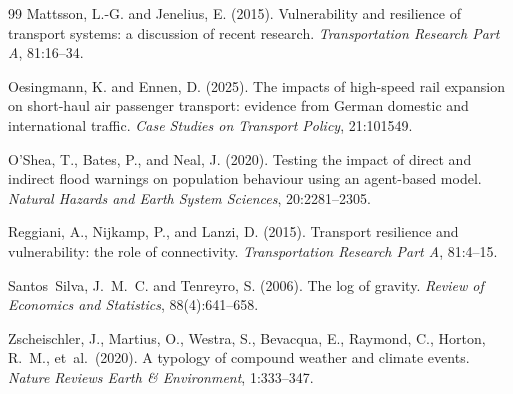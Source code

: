 \documentclass[12pt,a4paper]{article}
\begin{document}
\begin{thebibliography}{99}
Mattsson, L.-G. and Jenelius, E. (2015).
Vulnerability and resilience of transport systems: a discussion of recent research.
\textit{Transportation Research Part A}, 81:16--34.

Oesingmann, K. and Ennen, D. (2025).
The impacts of high-speed rail expansion on short-haul air passenger transport:
evidence from German domestic and international traffic.
\textit{Case Studies on Transport Policy}, 21:101549.

O'Shea, T., Bates, P., and Neal, J. (2020).
Testing the impact of direct and indirect flood warnings on population behaviour
using an agent-based model.
\textit{Natural Hazards and Earth System Sciences}, 20:2281--2305.

Reggiani, A., Nijkamp, P., and Lanzi, D. (2015).
Transport resilience and vulnerability: the role of connectivity.
\textit{Transportation Research Part A}, 81:4--15.

Santos~Silva, J.~M.~C. and Tenreyro, S. (2006).
The log of gravity.
\textit{Review of Economics and Statistics}, 88(4):641--658.

Zscheischler, J., Martius, O., Westra, S., Bevacqua, E., Raymond, C.,
Horton, R.~M., et~al.\ (2020).
A typology of compound weather and climate events.
\textit{Nature Reviews Earth \& Environment}, 1:333--347.

\end{thebibliography}
\end{document}
